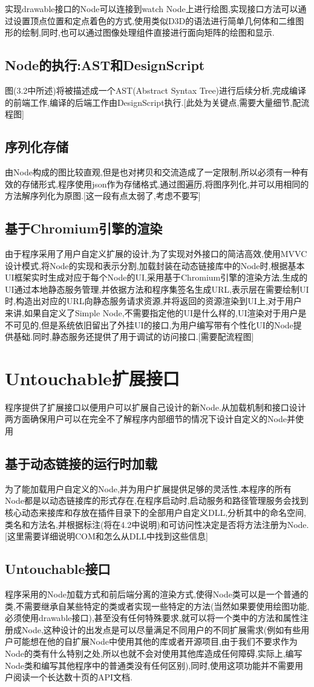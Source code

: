 \documentclass[10pt,journal,compsoc,UTF8]{IEEEtran}
\begin{document}
  实现drawable接口的Node可以连接到watch Node上进行绘图,实现接口方法可以通过设置顶点位置和定点着色的方式,使用类似D3D的语法进行简单几何体和二维图形的绘制,同时,也可以通过图像处理组件直接进行面向矩阵的绘图和显示.
  \subsection{Node的执行:AST和DesignScript}
  图(3.2中所述)将被描述成一个AST(Abstract Syntax Tree)进行后续分析,完成编译的前端工作,编译的后端工作由DesignScript执行.[此处为关键点,需要大量细节,配流程图]
  \subsection{序列化存储}
  由Node构成的图比较直观,但是也对拷贝和交流造成了一定限制,所以必须有一种有效的存储形式,程序使用json作为存储格式,通过图遍历,将图序列化,并可以用相同的方法解序列化为原图.[这一段有点太弱了,考虑不要写]
  \subsection{基于Chromium引擎的渲染}
  由于程序采用了用户自定义扩展的设计,为了实现对外接口的简洁高效,使用MVVC设计模式,将Node的实现和表示分割,加载封装在动态链接库中的Node时,根据基本UI框架实时生成对应于每个Node的UI,采用基于Chromium引擎的渲染方法,生成的UI通过本地静态服务管理,并依据方法和程序集签名生成URL,表示层在需要绘制UI时,构造出对应的URL向静态服务请求资源,并将返回的资源渲染到UI上,对于用户来讲,如果自定义了Simple Node,不需要指定他的UI是什么样的,UI渲染对于用户是不可见的,但是系统依旧留出了外挂UI的接口,为用户编写带有个性化UI的Node提供基础.同时,静态服务还提供了用于调试的访问接口.[需要配流程图]
\section{Untouchable扩展接口}
程序提供了扩展接口以便用户可以扩展自己设计的新Node.从加载机制和接口设计两方面确保用户可以在完全不了解程序内部细节的情况下设计自定义的Node并使用
  \subsection{基于动态链接的运行时加载}
  为了能加载用户自定义的Node,并为用户扩展提供足够的灵活性,本程序的所有Node都是以动态链接库的形式存在,在程序启动时,启动服务和路径管理服务会找到核心动态来接库和存放在插件目录下的全部用户自定义DLL,分析其中的命名空间,类名和方法名,并根据标注(将在4.2中说明)和可访问性决定是否将方法注册为Node.[这里需要详细说明COM和怎么从DLL中找到这些信息]
  \subsection{Untouchable接口}
  程序采用的Node加载方式和前后端分离的渲染方式,使得Node类可以是一个普通的类,不需要继承自某些特定的类或者实现一些特定的方法(当然如果要使用绘图功能,必须使用drawable接口),甚至没有任何特殊要求,就可以将一个类中的方法和属性注册成Node,这种设计的出发点是可以尽量满足不同用户的不同扩展需求(例如有些用户可能想在他的自扩展Node中使用其他的库或者开源项目,由于我们不要求作为Node的类有什么特别之处,所以也就不会对使用其他库造成任何障碍,实际上,编写Node类和编写其他程序中的普通类没有任何区别),同时,使用这项功能并不需要用户阅读一个长达数十页的API文档.
\end{document}
